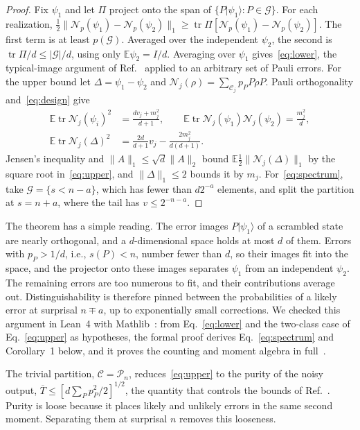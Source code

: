 \documentclass[aps,prl,reprint,superscriptaddress,amsmath,amssymb]{revtex4-2}
\newcommand{\E}{\mathbb E}
\newcommand{\Tb}{\overline T}
\newcommand{\N}{\mathcal N}
\newcommand{\tr}{\operatorname{tr}}
\begin{document}
\begin{proof}
Fix $\psi_1$ and let $\Pi$ project onto the span of
$\{P|\psi_1\rangle:P\in\mathcal G\}$. For each realization,
$\frac12\|\N_p(\psi_1)-\N_p(\psi_2)\|_1\ge\tr\Pi[\N_p(\psi_1)-\N_p(\psi_2)]$.
The first term is at least $p(\mathcal G)$. Averaged over the independent
$\psi_2$, the second is $\tr\Pi/d\le|\mathcal G|/d$, using only
$\E\psi_2=I/d$. Averaging over $\psi_1$ gives~\eqref{eq:lower}, the
typical-image argument of Ref.~\cite{Ibarrondo} applied to an arbitrary set of
Pauli errors. For the upper bound let $\Delta=\psi_1-\psi_2$ and
$\N_j(\rho)=\sum_{\mathcal C_j}p_PP\rho P$. Pauli orthogonality
and~\eqref{eq:design} give
\begin{align}
\E\tr\N_j(\psi_i)^2&=\frac{dv_j+m_j^2}{d+1},\qquad
\E\tr\N_j(\psi_1)\N_j(\psi_2)=\frac{m_j^2}{d},\nonumber\\
\E\tr\N_j(\Delta)^2&=\frac{2d}{d+1}v_j-\frac{2m_j^2}{d(d+1)}.
\label{eq:moment}
\end{align}
Jensen's inequality and $\|A\|_1\le\sqrt d\|A\|_2$ bound
$\E\frac12\|\N_j(\Delta)\|_1$ by the square root in~\eqref{eq:upper}, and
$\|\Delta\|_1\le2$ bounds it by $m_j$. For~\eqref{eq:spectrum}, take
$\mathcal G=\{s<n-a\}$, which has fewer than $d2^{-a}$ elements, and split the
partition at $s=n+a$, where the tail has $v\le2^{-n-a}$.
\end{proof}

The theorem has a simple reading. The error images $P|\psi_1\rangle$ of a
scrambled state are nearly orthogonal, and a $d$-dimensional space holds at
most $d$ of them. Errors with $p_P>1/d$, i.e., $s(P)<n$, number fewer than $d$,
so their images fit into the space, and the projector onto these images
separates $\psi_1$ from an independent $\psi_2$. The remaining errors are too
numerous to fit, and their contributions average out. Distinguishability is
therefore pinned between the probabilities of a likely error at surprisal
$n\mp a$, up to exponentially small corrections. We checked this argument in
Lean~4 with Mathlib~\cite{Lean,Mathlib}: from Eq.~\eqref{eq:lower} and the
two-class case of Eq.~\eqref{eq:upper} as hypotheses, the formal proof derives
Eq.~\eqref{eq:spectrum} and Corollary~1 below, and it proves the counting and
moment algebra in full~\cite{DataRepo}.

The trivial partition, $\mathcal C=\mathcal P_n$, reduces~\eqref{eq:upper} to the
purity of the noisy output, $\Tb\le[d\sum_Pp_P^2/2]^{1/2}$, the quantity that
controls the bounds of Ref.~\cite{Quek}. Purity is loose because it places
likely and unlikely errors in the same second moment. Separating them at
surprisal $n$ removes this looseness.
\end{document}
